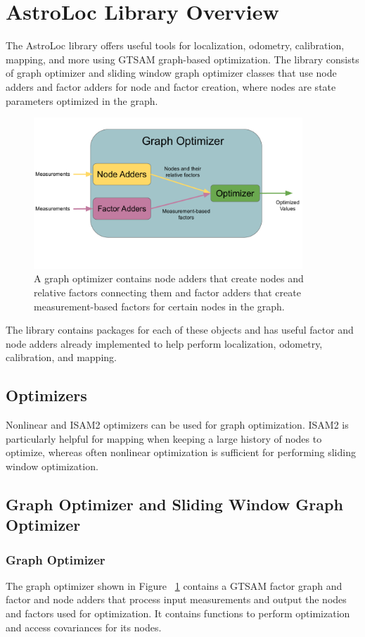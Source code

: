 \section{AstroLoc Library Overview}
The AstroLoc library offers useful tools for localization, odometry, calibration, mapping, and more using GTSAM graph-based optimization.
The library consists of graph optimizer and sliding window graph optimizer classes that use node adders and factor adders for node and factor creation, where nodes are state parameters optimized in the graph.
\begin{figure}[ht]
    \centering
\includegraphics[width=0.9\textwidth]{graph_opt.pdf}
 \caption{A graph optimizer contains node adders that create nodes and relative factors connecting them and factor adders that create measurement-based factors for certain nodes in the graph.}
  \label{img:graph_opt}
\end{figure}
The library contains packages for each of these objects and has useful factor and node adders already implemented to help perform localization, odometry, calibration, and mapping. 
\subsection{Optimizers}\label{sec:overview}
Nonlinear and ISAM2 optimizers can be used for graph optimization.
ISAM2 \cite{kaess2012isam2} is particularly helpful for mapping when keeping a large history of nodes to optimize, whereas often nonlinear optimization is sufficient for performing sliding window optimization.
\subsection{Graph Optimizer and Sliding Window Graph Optimizer}
\subsubsection{Graph Optimizer}
The graph optimizer shown in Figure ~\ref{img:graph_opt} contains a GTSAM factor graph and factor and node adders that process input measurements and output the nodes and factors used for optimization.
It contains functions to perform optimization and access covariances for its nodes.
